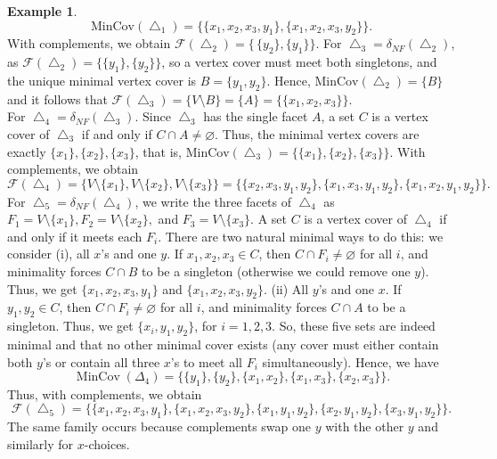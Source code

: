 \documentclass[12pt]{article}
\theoremstyle{plain}
\theoremstyle{definition}
\newtheorem{example}[theorem]{Example}
\newcommand{\MIN}{\mathrm{MinCov}}
\begin{document}
\begin{example}
		\[
		\MIN(\bigtriangleup_1)=\bigl\{\{x_1,x_2,x_3,y_1\}, \{x_1,x_2,x_3,y_2\}\bigr\}.
		\]
		With complements, we obtain $\mathcal{F}(\bigtriangleup_2)=\bigl\{\,\{y_2\}, \{y_1\}\bigr\}.$ 
		For  \(\bigtriangleup_3=\delta_{NF}(\bigtriangleup_2)\), as \(\mathcal{F}(\bigtriangleup_2)=\{\{y_1\},\{y_2\}\}\), so a vertex cover must meet both singletons, and the unique minimal vertex cover is \(B=\{y_1,y_2\}\).
		Hence,  $\MIN(\bigtriangleup_2)=\{B\}$ and it follows that $	\mathcal{F}(\bigtriangleup_3)=\{V\setminus B\}=\{A\}=\bigl\{\{x_1,x_2,x_3\}\bigr\}.$\\
		For \(\bigtriangleup_4=\delta_{NF}(\bigtriangleup_3)\). Since \(\bigtriangleup_3\) has the single facet \(A\), a set \(C\) is a vertex cover of \(\bigtriangleup_3\) if and only if \(C\cap A\neq\varnothing\).
		Thus, the minimal vertex covers are exactly \(\{x_1\},\{x_2\},\{x_3\}\), that is,
		 $\MIN(\bigtriangleup_3)=\bigl\{\{x_1\},\{x_2\},\{x_3\}\bigr\}.$ With complements, we obtain
		\[
		\mathcal{F}(\bigtriangleup_4)=\bigl\{V\setminus\{x_1\}, V\setminus\{x_2\}, V\setminus\{x_3\}\bigr\}
		=
		\bigl\{\{x_2,x_3,y_1,y_2\},\{x_1,x_3,y_1,y_2\},\{x_1,x_2,y_1,y_2\}\bigr\}.
		\]
		For \(\bigtriangleup_5=\delta_{NF}(\bigtriangleup_4)\), we write the three facets of \(\bigtriangleup_4\) as
	 $F_1=V\setminus\{x_1\}, F_2=V\setminus\{x_2\},$ and $ F_3=V\setminus\{x_3\}.$ A set \(C\) is a vertex cover of \(\bigtriangleup_4\) if and only if it meets each \(F_i\).
		There are two natural minimal ways to do this: we consider (i), all \(x\)'s and one \(y\). If \(x_1,x_2,x_3\in C\), then \(C\cap F_i\neq\varnothing\) for all \(i\), and minimality forces
			\(C\cap B\) to be a singleton (otherwise we could remove one \(y\)). Thus, we get \(\{x_1,x_2,x_3,y_1\}\) and \(\{x_1,x_2,x_3,y_2\}\). (ii) All \(y\)'s and one \(x\). If \(y_1,y_2\in C\), then \(C\cap F_i\neq\varnothing\) for all \(i\), and minimality forces
			\(C\cap A\) to be a singleton. Thus, we get \(\{x_i,y_1,y_2\}\), for \(i=1,2,3\).  So, these five sets are indeed minimal and that no other minimal cover exists (any cover must either contain both \(y\)'s or contain all three \(x\)'s to meet all \(F_i\) simultaneously). Hence, we have
		$$
		\operatorname{MinCov}(\Delta_4)
		=
		\bigl\{
		\{y_1\},\{y_2\},
		\{x_1,x_2\},\{x_1,x_3\},\{x_2,x_3\}
		\bigr\}.
		$$
		Thus, with complements, we obtain
		\[
		\mathcal{F}(\bigtriangleup_5)=
		\bigl\{\{x_1,x_2,x_3,y_1\},\{x_1,x_2,x_3,y_2\},\{x_1,y_1,y_2\},\{x_2,y_1,y_2\},\{x_3,y_1,y_2\}\bigr\}.
		\]
		The same family occurs because complements swap one \(y\) with the other \(y\) and similarly for \(x\)-choices.

\end{example}
\end{document}
